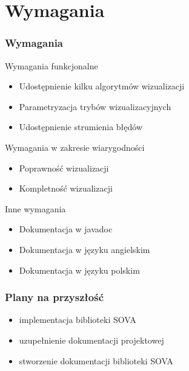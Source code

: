 \documentclass[xcolor=dvipsnames,9pt]{beamer}
\begin{document}
\section{Wymagania}

\begin{frame}
	\frametitle{Wymagania}

\begin{block}{Wymagania funkcjonalne}
		\begin{itemize}
			\item Udostępnienie kilku algorytmów wizualizacji
			  \item Parametryzacja trybów wizualizacyjnych
			\item Udostępnienie strumienia błędów
	\end{itemize}
	\end{block}

	\begin{block}{Wymagania w zakresie wiarygodności}
		\begin{itemize}
			\item Poprawność wizualizacji
			\item Kompletność wizualizacji
	\end{itemize}
	\end{block}

\begin{block}{Inne wymagania}
		\begin{itemize}
			\item Dokumentacja w javadoc
			  \item Dokumentacja w języku angielskim
			\item Dokumentacja w języku polskim 
	\end{itemize}
	\end{block}

\end{frame}


\begin{frame}
	\frametitle{Plany na przyszłość}
	\begin{block}{}
		\begin{itemize}
			\item  implementacja biblioteki SOVA
			  \item uzupełnienie dokumentacji projektowej
			\item stworzenie dokumentacji biblioteki SOVA
	\end{itemize}
	\end{block}
  



\end{frame}
\end{document}
